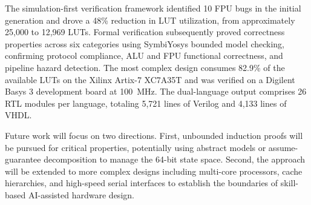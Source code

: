 \documentclass[journal]{IEEEtran}
\begin{document}
The simulation-first verification framework identified 10 FPU bugs in the initial generation and drove a 48\% reduction in LUT utilization, from approximately 25,000 to 12,969 LUTs. Formal verification subsequently proved correctness properties across six categories using SymbiYosys bounded model checking, confirming protocol compliance, ALU and FPU functional correctness, and pipeline hazard detection. The most complex design consumes 82.9\% of the available LUTs on the Xilinx Artix-7 XC7A35T and was verified on a Digilent Basys 3 development board at 100~MHz. The dual-language output comprises 26 RTL modules per language, totaling 5,721 lines of Verilog and 4,133 lines of VHDL.

Future work will focus on two directions. First, unbounded induction proofs will be pursued for critical properties, potentially using abstract models or assume-guarantee decomposition to manage the 64-bit state space. Second, the approach will be extended to more complex designs including multi-core processors, cache hierarchies, and high-speed serial interfaces to establish the boundaries of skill-based AI-assisted hardware design.

\clearpage


\end{document}
